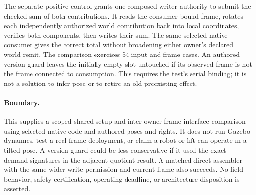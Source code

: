 \documentclass[11pt]{article}
\begin{document}
The separate positive control grants one composed writer authority
to submit the checked sum of both contributions. It reads the
consumer-bound frame, rotates each independently authorized world
contribution back into local coordinates, verifies both components,
then writes their sum. The same selected native consumer gives
the correct total without broadening either owner's declared
world remit. The comparison exercises 54 input and frame cases.
An authored version guard leaves the initially empty slot untouched
if its observed frame is not the frame connected to consumption.
This requires the test's serial binding; it is not a solution to
infer pose or to retire an old preexisting effect.

\paragraph{Boundary.}
This supplies a scoped shared-setup and inter-owner frame-interface
comparison using selected native code and authored poses and rights.
It does not run Gazebo dynamics, test a real frame deployment,
or claim a robot or lift can operate in a tilted pose. A version
guard could be less conservative if it used the exact demand
signatures in the adjacent quotient result. A matched direct
assembler with the same wider write permission and current frame
also succeeds. No field behavior, safety certification, operating
deadline, or architecture disposition is asserted.
\end{document}
